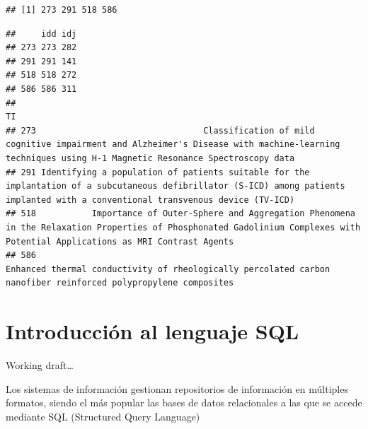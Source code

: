 \documentclass[]{book}
\newenvironment{Shaded}{\begin{snugshade}}{\end{snugshade}}
\newcommand{\KeywordTok}[1]{\textcolor[rgb]{0.13,0.29,0.53}{\textbf{#1}}}
\newcommand{\DecValTok}[1]{\textcolor[rgb]{0.00,0.00,0.81}{#1}}
\newcommand{\StringTok}[1]{\textcolor[rgb]{0.31,0.60,0.02}{#1}}
\newcommand{\CommentTok}[1]{\textcolor[rgb]{0.56,0.35,0.01}{\textit{#1}}}
\newcommand{\OperatorTok}[1]{\textcolor[rgb]{0.81,0.36,0.00}{\textbf{#1}}}
\newcommand{\NormalTok}[1]{#1}
\begin{document}
\begin{Shaded}
\end{Shaded}

\begin{verbatim}
## [1] 273 291 518 586
\end{verbatim}

\begin{Shaded}
\end{Shaded}

\begin{verbatim}
##     idd idj
## 273 273 282
## 291 291 141
## 518 518 272
## 586 586 311
##                                                                                                                                                                                      TI
## 273                                 Classification of mild cognitive impairment and Alzheimer's Disease with machine-learning techniques using H-1 Magnetic Resonance Spectroscopy data
## 291 Identifying a population of patients suitable for the implantation of a subcutaneous defibrillator (S-ICD) among patients implanted with a conventional transvenous device (TV-ICD)
## 518           Importance of Outer-Sphere and Aggregation Phenomena in the Relaxation Properties of Phosphonated Gadolinium Complexes with Potential Applications as MRI Contrast Agents
## 586                                                                      Enhanced thermal conductivity of rheologically percolated carbon nanofiber reinforced polypropylene composites
\end{verbatim}

\chapter{Introducción al lenguaje
SQL}\label{introduccion-al-lenguaje-sql}

Working draft\ldots{}

Los sistemas de información gestionan repositorios de información en
múltiples formatos, siendo el más popular las bases de datos
relacionales a las que se accede mediante SQL (Structured Query
Language)
\end{document}
